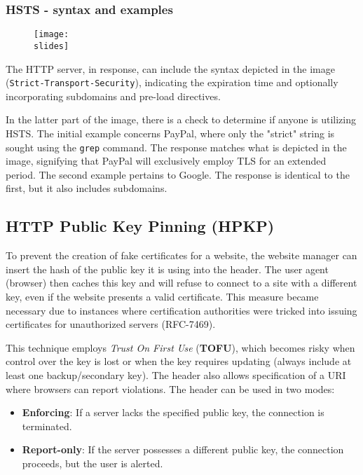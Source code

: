 \subsubsection{HSTS - syntax and examples}

\begin{figure}[h]
    \centering
    \texttt{[image: \\slides]}
\end{figure}

The HTTP server, in response, can include the syntax depicted in the image \\(\texttt{Strict-Transport-Security}), indicating the expiration time and optionally incorporating subdomains and pre-load directives.

In the latter part of the image, there is a check to determine if anyone is utilizing HSTS. The initial example concerns PayPal, where only the "strict" string is sought using the \texttt{grep} command. The response matches what is depicted in the image, signifying that PayPal will exclusively employ TLS for an extended period.
The second example pertains to Google. The response is identical to the first, but it also includes subdomains.


\subsection{HTTP Public Key Pinning (HPKP)}

To prevent the creation of fake certificates for a website, the website manager can insert the hash of the public key it is using into the header. The user agent (browser) then caches this key and will refuse to connect to a site with a different key, even if the website presents a valid certificate. This measure became necessary due to instances where certification authorities were tricked into issuing certificates for unauthorized servers (RFC-7469).

This technique employs \textit{Trust On First Use} (\textbf{TOFU}), which becomes risky when control over the key is lost or when the key requires updating (always include at least one backup/secondary key). The header also allows specification of a URI where browsers can report violations. The header can be used in two modes:
\begin{itemize}
    \item \textbf{Enforcing}: If a server lacks the specified public key, the connection is terminated.
    \item \textbf{Report-only}: If the server possesses a different public key, the connection proceeds, but the user is alerted.
\end{itemize}


